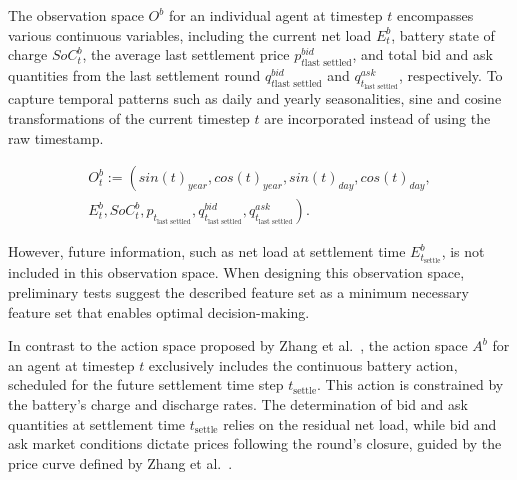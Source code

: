 \documentclass[preprint, 12pt]{elsarticle}
\newcommand{\stl}{\text{settle}}
\newcommand{\lstl}{\text{last settled}}
\begin{document}
The observation space $O^b$ for an individual agent at timestep $t$ encompasses various continuous variables, including the current net load $E^b_t$, battery state of charge $SoC^b_t$, the average last settlement price $p^{bid}_{t{\lstl}}$, and total bid and ask quantities from the last settlement round $q^{bid}_{t{\lstl}}$ and $q^{ask}_{t_{\lstl}}$, respectively. To capture temporal patterns such as daily and yearly seasonalities, sine and cosine transformations of the current timestep $t$ are incorporated instead of using the raw timestamp.

\begin{equation}
    \label{eq:StateSpace}
    \begin{split}
        O^b_{t} := \left( \right. sin(t)_{year}, cos(t)_{year}, sin(t)_{day}, cos(t)_{day}, \\
         E^{b}_{t}, SoC^{b}_{t}, p_{t_{\lstl}}, q^{bid}_{t_{\lstl}}, q^{ask}_{t_{\lstl}} \left. \right).
    \end{split}
\end{equation}

However, future information, such as net load at settlement time $E^{b}_{t_{\stl}}$, is not included in this observation space. When designing this observation space, preliminary tests suggest the described feature set as a minimum necessary feature set that enables optimal decision-making.

In contrast to the action space proposed by Zhang et al.~\cite{ALEXV1}, the action space $A^b$ for an agent at timestep $t$ exclusively includes the continuous battery action, scheduled for the future settlement time step $t_{\stl}$. This action is constrained by the battery's charge and discharge rates. The determination of bid and ask quantities at settlement time $t_{\stl}$ relies on the residual net load, while bid and ask market conditions dictate prices following the round's closure, guided by the price curve defined by Zhang et al.~\cite{ALEXV1}.
\end{document}
